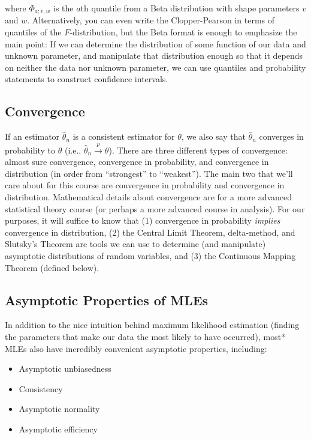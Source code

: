\documentclass[
  letterpaper,
  DIV=11,
  numbers=noendperiod]{scrreprt}
\begin{document}
where \(\Phi_{a; v, w}\) is the \(a\)th quantile from a Beta
distribution with shape parameters \(v\) and \(w\). Alternatively, you
can even write the Clopper-Pearson in terms of quantiles of the
\(F\)-distribution, but the Beta format is enough to emphasize the main
point: If we can determine the distribution of some function of our data
and unknown parameter, and manipulate that distribution enough so that
it depends on neither the data nor unknown parameter, we can use
quantiles and probability statements to construct confidence intervals.

\subsection*{Convergence}\label{convergence}

If an estimator \(\hat{\theta}_n\) is a consistent estimator for
\(\theta\), we also say that \(\hat{\theta}_n\) converges in probability
to \(\theta\) (i.e., \(\hat{\theta}_n \overset{p}{\to} \theta\)). There
are three different types of convergence: almost sure convergence,
convergence in probability, and convergence in distribution (in order
from ``strongest'' to ``weakest''). The main two that we'll care about
for this course are convergence in probability and convergence in
distribution. Mathematical details about convergence are for a more
advanced statistical theory course (or perhaps a more advanced course in
analysis). For our purposes, it will suffice to know that (1)
convergence in probability \emph{implies} convergence in distribution,
(2) the Central Limit Theorem, delta-method, and Slutsky's Theorem are
tools we can use to determine (and manipulate) asymptotic distributions
of random variables, and (3) the Continuous Mapping Theorem (defined
below).

\subsection*{Asymptotic Properties of
MLEs}\label{asymptotic-properties-of-mles}

In addition to the nice intuition behind maximum likelihood estimation
(finding the parameters that make our data the most likely to have
occurred), most* MLEs also have incredibly convenient asymptotic
properties, including:

\begin{itemize}
\item
  Asymptotic unbiasedness
\item
  Consistency
\item
  Asymptotic normality
\item
  Asymptotic efficiency
\end{itemize}
\end{document}
